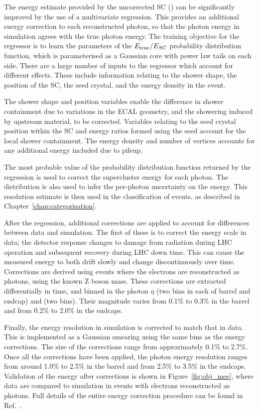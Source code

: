 The energy estimate provided by the uncorrected SC (\Eraw) can be significantly improved by the use of a multivariate regression.
This provides an additional energy correction to each reconstructed photon, so that the photon energy in simulation agrees with the true photon energy.
The training objective for the regressor is to learn the parameters of the $E_{\mathrm{true}}/E_{SC}$ probability distribution function, 
which is parameterised as a Gaussian core with power law tails on each side. %
There are a large number of inputs to the regressor which account for different effects.
These include information relating to the shower shape, the position of the SC, the seed crystal, and the energy density in the event.

The shower shape and position variables enable the difference in shower containment due to variations in the ECAL geometry, 
and the showering induced by upstream material, to be corrected.
Variables relating to the seed crystal position within the SC and energy ratios formed using the seed account for the local shower containment.
The energy density and number of vertices accounts for any additional energy included due to pileup.

The most probable value of the probability distribution function returned by the regression 
is used to correct the supercluster energy for each photon.
The distribution is also used to infer the per-photon uncertainty on the energy.
This resolution estimate is then used in the classification of events, as described in Chapter~\ref{chap:categorisation}.

After the regression, additional corrections are applied to account for differences between data and simulation.
The first of these is to correct the energy scale in data;
the detector response changes to damage from radiation during LHC operation and subsequent recovery during LHC down time.
This can cause the measured energy to both drift slowly and change discontinuously over time.
Corrections are derived using \Zee events where the electrons are reconstructed as photons, using the known Z boson mass.
These corrections are extracted differentially in time, and binned in the photon $\eta$ (two bins in each of barrel and endcap) and \RNINE (two bins).
Their magnitude varies from 0.1\% to 0.3\% in the barrel and from 0.2\% to 2.0\% in the endcaps.

Finally, the energy resolution in simulation is corrected to match that in data.
This is implemented as a Gaussian smearing using the same bins as the energy corrections.
The size of the corrections range from approximately 0.1\% to 2.7\%.
Once all the corrections have been applied, the photon energy resolution ranges from around 1.0\% to 2.5\% in the barrel
and from 2.5\% to 3.5\% in the endcaps.
Validation of the energy after corrections is shown in Figure~\ref{fig:obj_mee}, 
where data are compared to simulation in \Zee events with electrons reconstructed as photons.
Full details of the entire energy correction procedure can be found in Ref.~\cite{PhotonReco}.

